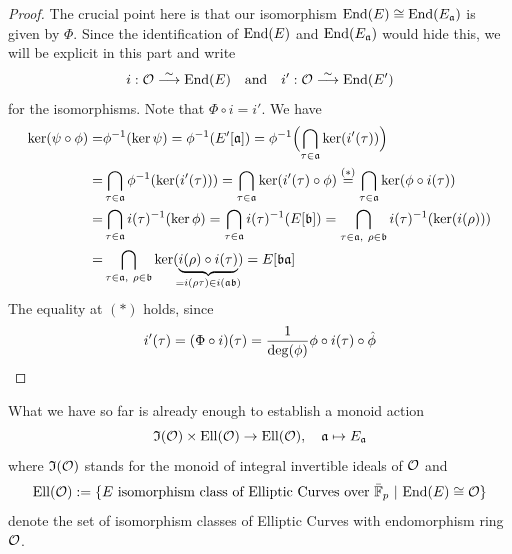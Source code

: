 \begin{proof}
    The crucial point here is that our isomorphism $\mathrm{End}(E) \cong \mathrm{End}(E_{\mathfrak{a}})$ is given by $\Phi$.
    Since the identification of $\mathrm{End}(E)$ and $\mathrm{End}(E_{\mathfrak{a}})$ would hide this, we will be explicit in this part and write
    \begin{align*}
        i: \mathcal{O} \overset{\sim}{\longrightarrow} \mathrm{End}(E) \quad \text{and} \quad i': \mathcal{O} \overset{\sim}{\longrightarrow} \mathrm{End}(E')
    \end{align*}
    for the isomorphisms.
    Note that $\Phi \circ i = i'$.
    We have
    \begin{align*}
        \ker(\psi \circ \phi) =& \phi^{-1}(\ker\psi) = \phi^{-1}(E'[\mathfrak{a}]) = \phi^{-1}\Bigl( \bigcap_{\tau \in \mathfrak{a}} \ker(i'(\tau)) \Bigr) \\
        =& \bigcap_{\tau \in \mathfrak{a}} \phi^{-1}(\ker(i'(\tau))) = \bigcap_{\tau \in \mathfrak{a}} \ker(i'(\tau) \circ \phi) \overset{(*)}{=} \bigcap_{\tau \in \mathfrak{a}} \ker(\phi \circ i(\tau)) \\
        =& \bigcap_{\tau \in \mathfrak{a}} i(\tau)^{-1}(\ker\phi) = \bigcap_{\tau \in \mathfrak{a}} i(\tau)^{-1}(E[\mathfrak{b}]) = \bigcap_{\tau \in \mathfrak{a}, \ \rho \in \mathfrak{b}} i(\tau)^{-1}(\ker(i(\rho))) \\
        =& \bigcap_{\tau \in \mathfrak{a}, \ \rho \in \mathfrak{b}} \ker(\underbrace{i(\rho) \circ i(\tau)}_{\mathclap{= i(\rho\tau) \in i(\a\b)}}) = E[\mathfrak{b}\mathfrak{a}]
    \end{align*}
    The equality at $(*)$ holds, since
    \begin{equation*}
        i'(\tau) = (\Phi \circ i)(\tau) = \frac 1 {\deg(\phi)} \phi \circ i(\tau) \circ \hat{\phi} \qedhere
    \end{equation*}
\end{proof}
What we have so far is already enough to establish a monoid action
\begin{equation*}
    \mathfrak{I}(\mathcal{O}) \times \mathrm{Ell}(\mathcal{O}) \to \mathrm{Ell}(\mathcal{O}), \quad \mathfrak{a} \mapsto E_{\mathfrak{a}}
\end{equation*}
where $\mathfrak{I}(\mathcal{O})$ stands for the monoid of integral invertible ideals of $\mathcal{O}$ and
\begin{equation*}
    \mathrm{Ell}(\mathcal{O}) := \{ \text{$E$ isomorphism class of Elliptic Curves over $\bar{\mathbb{F}}_p$} \ | \ \mathrm{End}(E) \cong \mathcal{O} \}
\end{equation*}
denote the set of isomorphism classes of Elliptic Curves with endomorphism ring $\mathcal{O}$.


